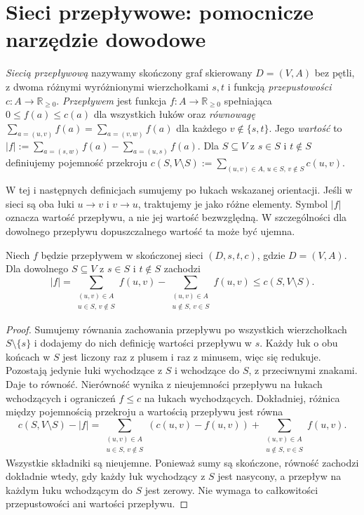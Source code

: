 \section{Sieci przepływowe: pomocnicze narzędzie dowodowe}
\label{sec:tg-flows}

\begin{definicja}
\emph{Siecią przepływową} nazywamy skończony graf skierowany
$D=(V,A)$ bez pętli, z dwoma różnymi wyróżnionymi wierzchołkami
$s,t$ i funkcją \emph{przepustowości}
$c:A\to\mathbb R_{\ge0}$.
\emph{Przepływem} jest funkcja $f:A\to\mathbb R_{\ge0}$
spełniająca $0\le f(a)\le c(a)$ dla wszystkich łuków oraz
\emph{równowagę} $\sum_{a=(u,v)}f(a)=\sum_{a=(v,w)}f(a)$
dla każdego $v\notin\{s,t\}$. Jego \emph{wartość} to
$|f|:=\sum_{a=(s,w)}f(a)-\sum_{a=(u,s)}f(a)$.
Dla $S\subseteq V$ z $s\in S$ i $t\notin S$ definiujemy
pojemność przekroju
$c(S,V\setminus S):=\sum_{(u,v)\in A,\,u\in S,\,v\notin S}c(u,v)$.
\end{definicja}

W tej i następnych definicjach sumujemy po łukach
wskazanej orientacji. Jeśli w sieci są oba łuki $u\to v$
i $v\to u$, traktujemy je jako różne elementy.
Symbol $|f|$ oznacza wartość przepływu, a nie jej wartość
bezwzględną. W szczególności dla dowolnego przepływu
dopuszczalnego wartość ta może być ujemna.

\begin{lemat}
\label{lem:tg-cutbound}
Niech $f$ będzie przepływem w skończonej sieci
$(D,s,t,c)$, gdzie $D=(V,A)$. Dla dowolnego $S\subseteq V$ z $s\in S$ i $t\notin S$
zachodzi
\[
|f|=\sum_{\substack{(u,v)\in A\\u\in S,\,v\notin S}}f(u,v)
 -\sum_{\substack{(u,v)\in A\\u\notin S,\,v\in S}}f(u,v)
 \le c(S,V\setminus S).
\]
\end{lemat}

\begin{proof}
Sumujemy równania zachowania przepływu po wszystkich
wierzchołkach $S\setminus\{s\}$ i dodajemy do nich
definicję wartości przepływu w $s$. Każdy łuk o obu końcach
w $S$ jest liczony raz z plusem i raz z minusem, więc się
redukuje. Pozostają jedynie łuki wychodzące z $S$
i wchodzące do $S$, z przeciwnymi znakami. Daje to równość.
Nierówność wynika z nieujemności przepływu na łukach
wchodzących i ograniczeń $f\le c$ na łukach wychodzących.
Dokładniej, różnica między pojemnością przekroju
a wartością przepływu jest równa
\[
c(S,V\setminus S)-|f|
=\sum_{\substack{(u,v)\in A\\u\in S,\,v\notin S}}
(c(u,v)-f(u,v))
+\sum_{\substack{(u,v)\in A\\u\notin S,\,v\in S}}f(u,v).
\]
Wszystkie składniki są nieujemne. Ponieważ sumy
są skończone, równość zachodzi dokładnie wtedy,
gdy każdy łuk wychodzący z $S$ jest nasycony,
a przepływ na każdym łuku wchodzącym do $S$
jest zerowy. Nie wymaga to całkowitości
przepustowości ani wartości przepływu.
\end{proof}

